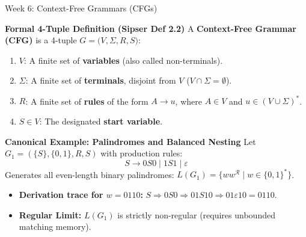 \documentclass[aspectratio=169, 10pt]{beamer}
\begin{document}
\begin{frame}{Week 6: Context-Free Grammars (CFGs)}
  \begin{tcolorbox}[conceptcard]
    {\bfseries\footnotesize\color{gimpanavy} Formal 4-Tuple Definition (Sipser Def 2.2)}
    \vspace{0.04cm}
    \footnotesize
    A \textbf{Context-Free Grammar (CFG)} is a 4-tuple $G = \bigl(V, \Sigma, R, S\bigr)$:
    \begin{enumerate}\setlength{\itemsep}{2pt}
      \item $V$: A finite set of \textbf{variables} (also called non-terminals).
      \item $\Sigma$: A finite set of \textbf{terminals}, disjoint from $V$ ($V \cap \Sigma = \emptyset$).
      \item $R$: A finite set of \textbf{rules} of the form $A \to u$, where $A \in V$ and $u \in (V \cup \Sigma)^*$.
      \item $S \in V$: The designated \textbf{start variable}.
    \end{enumerate}
  \end{tcolorbox}

  \vspace{0.06cm}
  \begin{tcolorbox}[examplecard]
    {\bfseries\footnotesize\color{accentGreen} Canonical Example: Palindromes and Balanced Nesting}
    \vspace{0.04cm}
    \footnotesize
    Let $G_1 = (\{S\}, \{0, 1\}, R, S)$ with production rules:
    $$S \to 0S0 \;\big|\; 1S1 \;\big|\; \varepsilon$$
    Generates all even-length binary palindromes: $L(G_1) = \bigl\{w w^{\mathcal{R}} \;\big|\; w \in \{0, 1\}^*\bigr\}$.
    \vspace{0.02cm}
    \begin{itemize}\setlength{\itemsep}{1pt}\scriptsize
      \item \textbf{Derivation trace for $w = 0110$:} $S \Rightarrow 0S0 \Rightarrow 01S10 \Rightarrow 01\varepsilon10 = 0110$.
      \item \textbf{Regular Limit:} $L(G_1)$ is strictly non-regular (requires unbounded matching memory).
    \end{itemize}
  \end{tcolorbox}
\end{frame}
\end{document}
